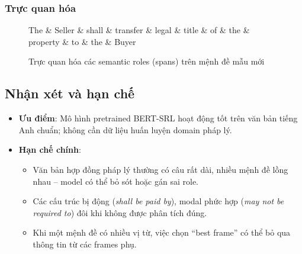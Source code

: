 \subsubsection{Trực quan hóa}

\begin{figure}[H]
    \centering
    \begin{dependency}[theme = simple]
        \begin{deptext}[column sep=0.3cm]
            The \& Seller \& shall \& transfer \& legal \& title \& of \& the \& property \& to \& the \& Buyer \\
        \end{deptext}
        
    \end{dependency}
    \caption{Trực quan hóa các semantic roles (spans) trên mệnh đề mẫu mới}
    \label{fig:srl_vis}
\end{figure}

\subsection{Nhận xét và hạn chế}

\begin{itemize}
    \item \textbf{Ưu điểm}: Mô hình pretrained BERT-SRL hoạt động tốt trên văn bản tiếng Anh chuẩn; không cần dữ liệu huấn luyện domain pháp lý.
    \item \textbf{Hạn chế chính}:
    \begin{itemize}
        \item Văn bản hợp đồng pháp lý thường có câu rất dài, nhiều mệnh đề lồng nhau -- model có thể bỏ sót hoặc gán sai role.
        \item Các cấu trúc bị động (\textit{shall be paid by}), modal phức hợp (\textit{may not be required to}) đôi khi không được phân tích đúng.
        \item Khi một mệnh đề có nhiều vị từ, việc chọn ``best frame'' có thể bỏ qua thông tin từ các frames phụ.
    \end{itemize}
\end{itemize}

